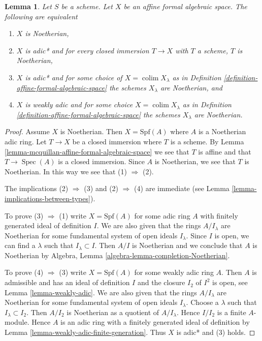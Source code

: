 \documentclass{stacks-project}
\theoremstyle{plain}
\newtheorem{lemma}[subsection]{Lemma}
\theoremstyle{definition}
\theoremstyle{remark}
\numberwithin{equation}{subsection}
\def\colim{\mathop{\mathrm{colim}}\nolimits}
\def\Spec{\mathop{\mathrm{Spec}}}
\begin{document}
\begin{lemma}
\label{lemma-characterize-noetherian-affine}
Let $S$ be a scheme. Let $X$ be an affine formal algebraic space.
The following are equivalent
\begin{enumerate}
\item $X$ is Noetherian,
\item $X$ is adic* and for every closed immersion $T \to X$ with $T$ a scheme,
$T$ is Noetherian,
\item $X$ is adic* and for some choice of $X = \colim X_\lambda$ as in
Definition \ref{definition-affine-formal-algebraic-space}
the schemes $X_\lambda$ are Noetherian, and
\item $X$ is weakly adic and for some choice $X = \colim X_\lambda$
as in Definition \ref{definition-affine-formal-algebraic-space}
the schemes $X_\lambda$ are Noetherian.
\end{enumerate}
\end{lemma}

\begin{proof}
Assume $X$ is Noetherian. Then $X = \text{Spf}(A)$ where
$A$ is a Noetherian adic ring.
Let $T \to X$ be a closed immersion where $T$ is a scheme.
By Lemma \ref{lemma-mcquillan-affine-formal-algebraic-space}
we see that $T$ is affine and that $T \to \Spec(A)$ is a closed
immersion. Since $A$ is Noetherian, we see that $T$ is Noetherian.
In this way we see that (1) $\Rightarrow$ (2).

\medskip\noindent
The implications (2) $\Rightarrow$ (3) and (2) $\Rightarrow$ (4) are
immediate (see Lemma \ref{lemma-implications-between-types}).

\medskip\noindent
To prove (3) $\Rightarrow$ (1) write $X = \text{Spf}(A)$
for some adic ring $A$ with finitely generated ideal of definition $I$.
We are also given that the rings $A/I_\lambda$ are Noetherian
for some fundamental system of open ideals $I_\lambda$.
Since $I$ is open, we can find a $\lambda$ such that $I_\lambda \subset I$.
Then $A/I$ is Noetherian and we conclude that $A$ is Noetherian by
Algebra, Lemma \ref{algebra-lemma-completion-Noetherian}.

\medskip\noindent
To prove (4) $\Rightarrow$ (3) write $X = \text{Spf}(A)$
for some weakly adic ring $A$. Then $A$ is admissible and
has an ideal of definition $I$ and the closure $I_2$ of $I^2$
is open, see Lemma \ref{lemma-weakly-adic}.
We are also given that the rings $A/I_\lambda$ are Noetherian
for some fundamental system of open ideals $I_\lambda$.
Choose a $\lambda$ such that $I_\lambda \subset I_2$.
Then $A/I_2$ is Noetherian as a quotient of $A/I_\lambda$.
Hence $I/I_2$ is a finite $A$-module.
Hence $A$ is an adic ring with a finitely generated ideal
of definition by Lemma \ref{lemma-weakly-adic-finite-generation}.
Thus $X$ is adic* and (3) holds.
\end{proof}
\end{document}
